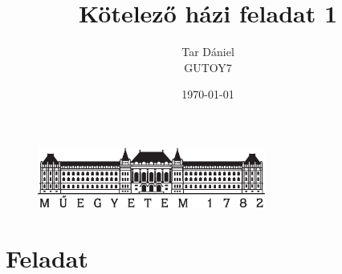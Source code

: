 \documentclass{article}
\begin{document}
	
	\begin{titlepage}
		\setlength{\headheight}{20pt}
		\title{\huge Kötelező házi feladat 1
		}
		\author{Tar Dániel\\GUTOY7}
		\date{\today}
		\maketitle
		\thispagestyle{fancy}
		
		\begin{figure}
			\begin{center}
				\includegraphics[height=2cm]{logo_bme_kicsi.eps}
			\end{center}
		\end{figure}
		
	\end{titlepage}
	\newpage

	 
	\newpage
	
	
	\setlength{\headheight}{0pt}
	\tableofcontents
	\newpage
	
	\setcounter{page}{1}

	
	
	

	
	
	\section{Feladat}
	
\end{document}
